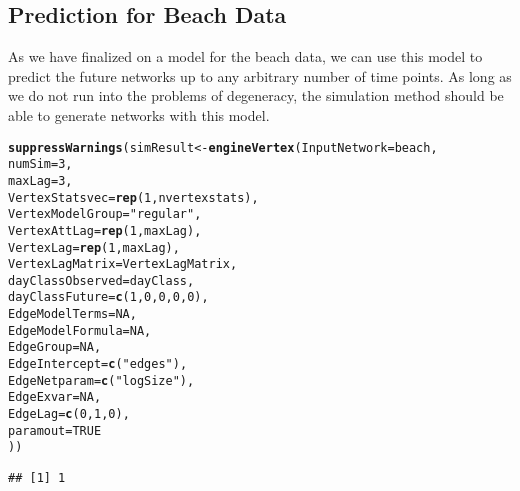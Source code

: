 \documentclass[12pt]{article}\usepackage[]{graphicx}\usepackage[]{color}
\makeatletter
\newcommand{\hlnum}[1]{\textcolor[rgb]{0.686,0.059,0.569}{#1}}%
\newcommand{\hlstr}[1]{\textcolor[rgb]{0.192,0.494,0.8}{#1}}%
\newcommand{\hlstd}[1]{\textcolor[rgb]{0.345,0.345,0.345}{#1}}%
\newcommand{\hlkwb}[1]{\textcolor[rgb]{0.69,0.353,0.396}{#1}}%
\newcommand{\hlkwc}[1]{\textcolor[rgb]{0.333,0.667,0.333}{#1}}%
\newcommand{\hlkwd}[1]{\textcolor[rgb]{0.737,0.353,0.396}{\textbf{#1}}}%
\newenvironment{kframe}{%
 \def\at@end@of@kframe{}%
 \ifinner\ifhmode%
  \def\at@end@of@kframe{\end{minipage}}%
  \begin{minipage}{\columnwidth}%
 \fi\fi%
 \def\FrameCommand##1{\hskip\@totalleftmargin \hskip-\fboxsep
 \colorbox{shadecolor}{##1}\hskip-\fboxsep
     \hskip-\linewidth \hskip-\@totalleftmargin \hskip\columnwidth}%
 \MakeFramed {\advance\hsize-\width
   \@totalleftmargin\z@ \linewidth\hsize
   \@setminipage}}%
 {\par\unskip\endMakeFramed%
 \at@end@of@kframe}
\newenvironment{knitrout}{}{} %
\makeatother
\begin{document}
\subsection{Prediction for Beach Data}
\label{sec:pred-beach-data}

As we have finalized on a model for the beach data, we can use this model to predict the future networks up to any arbitrary number of time points. As long as we do not run into the problems of degeneracy, the simulation method should be able to generate networks with this model.

\begin{knitrout}
\color{fgcolor}\begin{kframe}
\begin{alltt}
\hlkwd{suppressWarnings}\hlstd{(simResult} \hlkwb{<-} \hlkwd{engineVertex}\hlstd{(}\hlkwc{InputNetwork} \hlstd{= beach,}
                          \hlkwc{numSim} \hlstd{=} \hlnum{3}\hlstd{,}
                          \hlkwc{maxLag} \hlstd{=} \hlnum{3}\hlstd{,}
                          \hlkwc{VertexStatsvec} \hlstd{=} \hlkwd{rep}\hlstd{(}\hlnum{1}\hlstd{, nvertexstats),}
                          \hlkwc{VertexModelGroup} \hlstd{=} \hlstr{"regular"}\hlstd{,}
                          \hlkwc{VertexAttLag} \hlstd{=} \hlkwd{rep}\hlstd{(}\hlnum{1}\hlstd{, maxLag),}
                          \hlkwc{VertexLag} \hlstd{=} \hlkwd{rep}\hlstd{(}\hlnum{1}\hlstd{, maxLag),}
                          \hlkwc{VertexLagMatrix} \hlstd{= VertexLagMatrix,}
                          \hlkwc{dayClassObserved} \hlstd{= dayClass,}
                          \hlkwc{dayClassFuture} \hlstd{=} \hlkwd{c}\hlstd{(}\hlnum{1}\hlstd{,} \hlnum{0}\hlstd{,} \hlnum{0}\hlstd{,} \hlnum{0}\hlstd{,} \hlnum{0}\hlstd{),}
                          \hlkwc{EdgeModelTerms} \hlstd{=} \hlnum{NA}\hlstd{,}
                          \hlkwc{EdgeModelFormula} \hlstd{=} \hlnum{NA}\hlstd{,}
                          \hlkwc{EdgeGroup} \hlstd{=} \hlnum{NA}\hlstd{,}
                          \hlkwc{EdgeIntercept} \hlstd{=} \hlkwd{c}\hlstd{(}\hlstr{"edges"}\hlstd{),}
                          \hlkwc{EdgeNetparam} \hlstd{=} \hlkwd{c}\hlstd{(}\hlstr{"logSize"}\hlstd{),}
                          \hlkwc{EdgeExvar} \hlstd{=} \hlnum{NA}\hlstd{,}
                          \hlkwc{EdgeLag} \hlstd{=} \hlkwd{c}\hlstd{(}\hlnum{0}\hlstd{,} \hlnum{1}\hlstd{,} \hlnum{0}\hlstd{),}
                          \hlkwc{paramout} \hlstd{=} \hlnum{TRUE}
                          \hlstd{))}
\end{alltt}
\begin{verbatim}
## [1] 1
\end{verbatim}



\end{kframe}
\end{knitrout}
\end{document}
